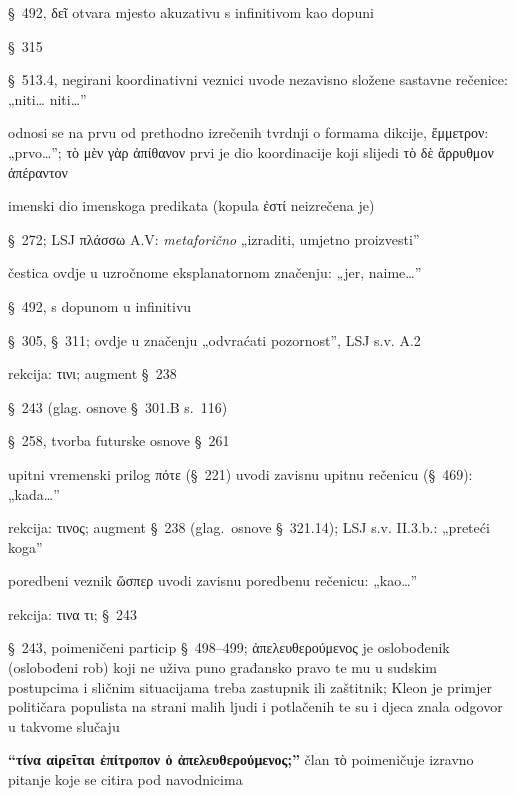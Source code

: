 \begin{description}[noitemsep]
\item[δεῖ] §~492, δεῖ otvara mjesto akuzativu s infinitivom kao dopuni
\item[εἶναι] §~315
\item[μήτε… μήτε] §~513.4, negirani koordinativni veznici uvode nezavisno složene sastavne rečenice: „niti… niti…”
\item[μὲν γὰρ ] odnosi se na prvu od prethodno izrečenih tvrdnji o formama dikcije, ἔμμετρον: „prvo…”; \textgreek[variant=ancient]{τὸ μὲν γὰρ ἀπίθανον} prvi je dio koordinacije koji slijedi \textgreek[variant=ancient]{τὸ δὲ ἄρρυθμον ἀπέραντον}
\item[ἀπίθανον] imenski dio imenskoga predikata (kopula ἐστί neizrečena je)
\item[πεπλάσθαι] §~272; LSJ πλάσσω A.V: \textit{metaforično} „izraditi, umjetno proizvesti”
\item[γὰρ] čestica ovdje u uzročnome eksplanatornom značenju: „jer, naime…”
\item[δοκεῖ] §~492, s dopunom u infinitivu
\item[ἐξίστησι] §~305, §~311; ovdje u značenju „odvraćati pozornost”, LSJ s.v. A.2
\item[προσέχειν] rekcija: τινι; augment §~238
\item[ποιεῖ] §~243 (glag. osnove §~301.B s.~116)
\item[ἥξει] §~258, tvorba futurske osnove §~261
\item[πότε… ἥξει] upitni vremenski prilog πότε (§~221) uvodi zavisnu upitnu rečenicu (§~469): „kada…”
\item[προλαμβάνουσι] rekcija: τινος; augment §~238 (glag.\ osnove §~321.14); LSJ s.v. II.3.b.: „preteći koga”
\item[ὥσπερ… προλαμβάνουσι] poredbeni veznik ὥσπερ uvodi zavisnu poredbenu rečenicu: „kao\dots”
\item[αἱρεῖται] rekcija: τινα τι; §~243
\item[ὁ ἀπελευθερούμενος] §~243, poimeničeni particip §~498–499; \textgreek[variant=ancient]{ἀπελευθερούμενος} je oslobođenik (oslobođeni rob) koji ne uživa puno građansko pravo te mu u sudskim postupcima i sličnim situacijama treba zastupnik ili zaštitnik; Kleon je primjer političara populista na strani malih ljudi i potlačenih te su i djeca znala odgovor u takvome slučaju
\item[τὸ] \textbf{\textgreek[variant=ancient]{“τίνα αἱρεῖται ἐπίτροπον ὁ ἀπελευθερούμενος;”}} član τὸ poimeničuje izravno pitanje koje se citira pod navodnicima

\end{description}
